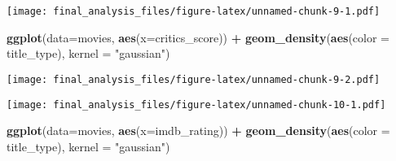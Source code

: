 \documentclass[]{article}
\newenvironment{Shaded}{\begin{snugshade}}{\end{snugshade}}
\newcommand{\KeywordTok}[1]{\textcolor[rgb]{0.13,0.29,0.53}{\textbf{#1}}}
\newcommand{\DataTypeTok}[1]{\textcolor[rgb]{0.13,0.29,0.53}{#1}}
\newcommand{\DecValTok}[1]{\textcolor[rgb]{0.00,0.00,0.81}{#1}}
\newcommand{\FloatTok}[1]{\textcolor[rgb]{0.00,0.00,0.81}{#1}}
\newcommand{\StringTok}[1]{\textcolor[rgb]{0.31,0.60,0.02}{#1}}
\newcommand{\OperatorTok}[1]{\textcolor[rgb]{0.81,0.36,0.00}{\textbf{#1}}}
\newcommand{\NormalTok}[1]{#1}
\begin{document}
\texttt{[image: final\_analysis\_files/figure-latex/unnamed-chunk-9-1.pdf]}

\begin{Shaded}
\begin{Highlighting}[]
\KeywordTok{ggplot}\NormalTok{(}\DataTypeTok{data=}\NormalTok{movies, }\KeywordTok{aes}\NormalTok{(}\DataTypeTok{x=}\NormalTok{critics_score)) }\OperatorTok{+}\StringTok{ }\KeywordTok{geom_density}\NormalTok{(}\KeywordTok{aes}\NormalTok{(}\DataTypeTok{color =}\NormalTok{ title_type), }\DataTypeTok{kernel =} \StringTok{"gaussian"}\NormalTok{)}
\end{Highlighting}
\end{Shaded}

\texttt{[image: final\_analysis\_files/figure-latex/unnamed-chunk-9-2.pdf]}

\begin{Shaded}
\end{Shaded}

\texttt{[image: final\_analysis\_files/figure-latex/unnamed-chunk-10-1.pdf]}

\begin{Shaded}
\begin{Highlighting}[]
\KeywordTok{ggplot}\NormalTok{(}\DataTypeTok{data=}\NormalTok{movies, }\KeywordTok{aes}\NormalTok{(}\DataTypeTok{x=}\NormalTok{imdb_rating)) }\OperatorTok{+}\StringTok{ }\KeywordTok{geom_density}\NormalTok{(}\KeywordTok{aes}\NormalTok{(}\DataTypeTok{color =}\NormalTok{ title_type), }\DataTypeTok{kernel =} \StringTok{"gaussian"}\NormalTok{)}
\end{Highlighting}
\end{Shaded}
\end{document}
